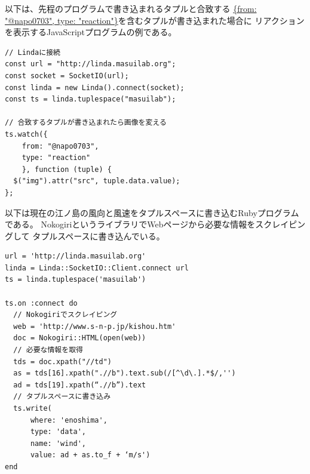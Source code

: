 以下は、先程のプログラムで書き込まれるタプルと合致する
\url{{from: "@napo0703", type: "reaction"}}を含むタプルが書き込まれた場合に
リアクションを表示するJavaScriptプログラムの例である。

\vspace{2mm}
\begin{verbatim}
// Lindaに接続
const url = "http://linda.masuilab.org";
const socket = SocketIO(url);
const linda = new Linda().connect(socket);
const ts = linda.tuplespace("masuilab");

// 合致するタプルが書き込まれたら画像を変える
ts.watch({
    from: "@napo0703",
    type: "reaction"
    }, function (tuple) {
  $("img").attr("src", tuple.data.value);
};
\end{verbatim}
\vspace{2mm}

以下は現在の江ノ島の風向と風速をタプルスペースに書き込むRubyプログラムである。
NokogiriというライブラリでWebページから必要な情報をスクレイピングして
タプルスペースに書き込んでいる。

\vspace{2mm}
\begin{verbatim}
url = 'http://linda.masuilab.org'
linda = Linda::SocketIO::Client.connect url
ts = linda.tuplespace('masuilab')

ts.on :connect do
  // Nokogiriでスクレイピング
  web = 'http://www.s-n-p.jp/kishou.htm'
  doc = Nokogiri::HTML(open(web))
  // 必要な情報を取得
  tds = doc.xpath("//td")
  as = tds[16].xpath(".//b").text.sub(/[^\d\.].*$/,'')
  ad = tds[19].xpath(“.//b”).text
  // タプルスペースに書き込み
  ts.write(
      where: 'enoshima',
      type: 'data',
      name: 'wind',
      value: ad + as.to_f + ‘m/s')
end
\end{verbatim}
\vspace{2mm}